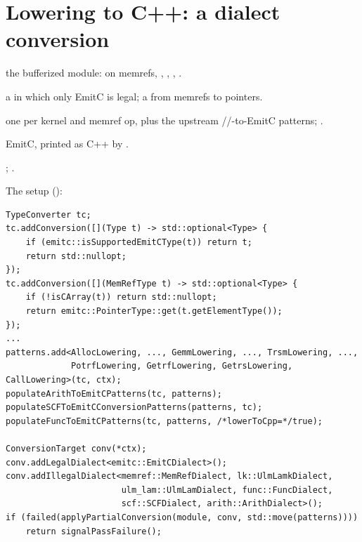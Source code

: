 \section{Lowering to C++: a dialect conversion}
\label{sec:kernels-emitc}

\begin{steps}
\item[Input] the bufferized module:  on memrefs, , , , .
\item[Representation] a  in which only EmitC is legal; a  from memrefs to pointers.
\item[Rule] one  per kernel and memref op, plus the upstream //-to-EmitC patterns; .
\item[Output] EmitC, printed as C++ by .
\item[Theory] ; .
\end{steps}

The setup ():

\begin{lstlisting}[style=cpp]
TypeConverter tc;
tc.addConversion([](Type t) -> std::optional<Type> {
    if (emitc::isSupportedEmitCType(t)) return t;
    return std::nullopt;
});
tc.addConversion([](MemRefType t) -> std::optional<Type> {
    if (!isCArray(t)) return std::nullopt;
    return emitc::PointerType::get(t.getElementType());
});
...
patterns.add<AllocLowering, ..., GemmLowering, ..., TrsmLowering, ...,
             PotrfLowering, GetrfLowering, GetrsLowering, CallLowering>(tc, ctx);
populateArithToEmitCPatterns(tc, patterns);
populateSCFToEmitCConversionPatterns(patterns, tc);
populateFuncToEmitCPatterns(tc, patterns, /*lowerToCpp=*/true);

ConversionTarget conv(*ctx);
conv.addLegalDialect<emitc::EmitCDialect>();
conv.addIllegalDialect<memref::MemRefDialect, lk::UlmLamkDialect,
                       ulm_lam::UlmLamDialect, func::FuncDialect,
                       scf::SCFDialect, arith::ArithDialect>();
if (failed(applyPartialConversion(module, conv, std::move(patterns))))
    return signalPassFailure();
\end{lstlisting}

